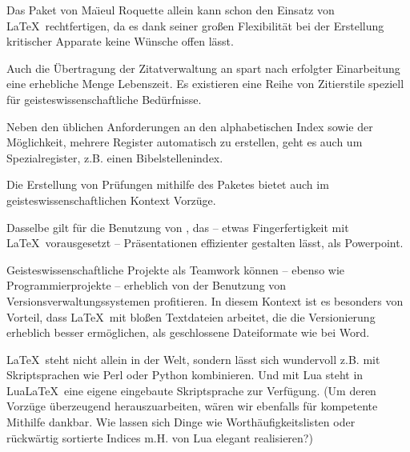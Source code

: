 \documentclass[ngerman]{dtk}
\begin{document}

Das Paket  von Ma\"{\i}eul Roquette allein kann schon den
Einsatz von \LaTeX\ rechtfertigen, da es dank seiner großen Flexibilität 
bei der Erstellung kritischer Apparate keine Wünsche offen lässt.


Auch die Übertragung der Zitatverwaltung an  spart nach erfolgter Einarbeitung eine erhebliche
Menge Lebenszeit. Es existieren eine Reihe von Zitierstile speziell für geisteswissenschaftliche Bedürfnisse.


Neben den üblichen Anforderungen an den alphabetischen Index sowie der Möglichkeit, mehrere Register
automatisch zu erstellen, geht es auch um Spezialregister, z.B. einen Bibelstellenindex.


Die Erstellung von Prüfungen mithilfe des Paketes  bietet auch im geisteswissenschaftlichen
Kontext Vorzüge.


Dasselbe gilt für die Benutzung von , das -- etwas Fingerfertigkeit mit \LaTeX\ vorausgesetzt --
Präsentationen effizienter gestalten lässt, als Powerpoint.


Geisteswissenschaftliche Projekte als Teamwork können -- ebenso wie Programmierprojekte -- erheblich von
der Benutzung von Versionsverwaltungssystemen profitieren.
In diesem Kontext ist es besonders von Vorteil, dass \LaTeX\ mit bloßen Textdateien arbeitet, die die
Versionierung erheblich besser ermöglichen, als geschlossene Dateiformate wie bei Word.


\LaTeX\ steht nicht allein in der Welt, sondern lässt sich wundervoll z.B. mit Skriptsprachen wie Perl oder
Python kombinieren. Und mit Lua steht in Lua\LaTeX\ eine eigene eingebaute Skriptsprache zur Verfügung.
(Um deren Vorzüge überzeugend herauszuarbeiten, wären wir ebenfalls für kompetente Mithilfe dankbar.
Wie lassen sich Dinge wie Worthäufigkeitslisten oder rückwärtig sortierte Indices m.H. von Lua elegant
realisieren?)
\end{document}
